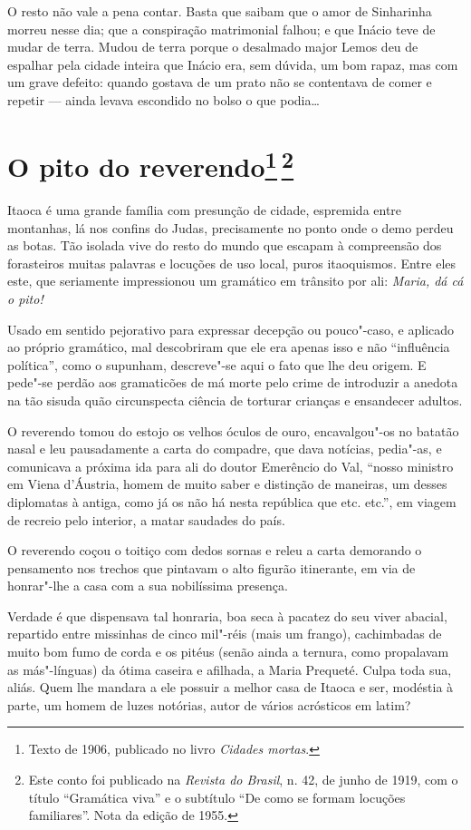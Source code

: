 O resto não vale a pena contar. Basta que saibam que o amor de
Sinharinha morreu nesse dia; que a conspiração matrimonial falhou; e que
Inácio teve de mudar de terra. Mudou de terra porque o desalmado major
Lemos deu de espalhar pela cidade inteira que Inácio era, sem dúvida, um
bom rapaz, mas com um grave defeito: quando gostava de um prato não se
contentava de comer e repetir --- ainda levava escondido no bolso o que
podia\ldots{}

\chapter{O pito do reverendo\footnote[*]{Texto de 1906, publicado no livro \emph{Cidades mortas}.}\,\footnote[**]{Este conto foi publicado
  na \emph{Revista do Brasil}, n. 42, de junho de 1919, com o título
  ``Gramática viva'' e o subtítulo ``De como se formam locuções
  familiares''. Nota da edição de 1955.}}

Itaoca é uma grande família com presunção de cidade, espremida entre
montanhas, lá nos confins do Judas, precisamente no ponto onde o demo
perdeu as botas. Tão isolada vive do resto do mundo que escapam à
compreensão dos forasteiros muitas palavras e locuções de uso local,
puros itaoquismos. Entre eles este, que seriamente impressionou um
gramático em trânsito por ali: \emph{Maria, dá cá o pito!}

Usado em sentido pejorativo para expressar decepção ou pouco"-caso, e
aplicado ao próprio gramático, mal descobriram que ele era apenas isso e
não ``influência política'', como o supunham, descreve"-se aqui o fato
que lhe deu origem. E pede"-se perdão aos gramaticões de má morte pelo
crime de introduzir a anedota na tão sisuda quão circunspecta ciência de
torturar crianças e ensandecer adultos.

O reverendo tomou do estojo os velhos óculos de ouro, encavalgou"-os no
batatão nasal e leu pausadamente a carta do compadre, que dava notícias,
pedia"-as, e comunicava a próxima ida para ali do doutor Emerêncio do
Val, ``nosso ministro em Viena d'Áustria, homem de muito saber e
distinção de maneiras, um desses diplomatas à antiga, como já os não há
nesta república que etc. etc.'', em viagem de recreio pelo interior, a
matar saudades do país.

O reverendo coçou o toitiço com dedos sornas e releu a carta demorando o
pensamento nos trechos que pintavam o alto figurão itinerante, em via de
honrar"-lhe a casa com a sua nobilíssima presença.

Verdade é que dispensava tal honraria, boa seca à pacatez do seu viver
abacial, repartido entre missinhas de cinco mil"-réis (mais um frango),
cachimbadas de muito bom fumo de corda e os pitéus (senão ainda a
ternura, como propalavam as más"-línguas) da ótima caseira e afilhada, a
Maria Prequeté. Culpa toda sua, aliás. Quem lhe mandara a ele possuir a
melhor casa de Itaoca e ser, modéstia à parte, um homem de luzes
notórias, autor de vários acrósticos em latim?

